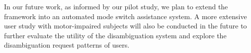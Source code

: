 \documentclass[natbib, twocolumn]{svjour3}          %
\begin{document}
In our future work, as informed by our pilot study, we plan to extend the framework into an automated mode switch assistance system. A more extensive user study with motor-impaired subjects will also be conducted in the future to further evaluate the utility of the disambiguation system and explore the disambiguation request patterns of users.  


\balance
\end{document}

